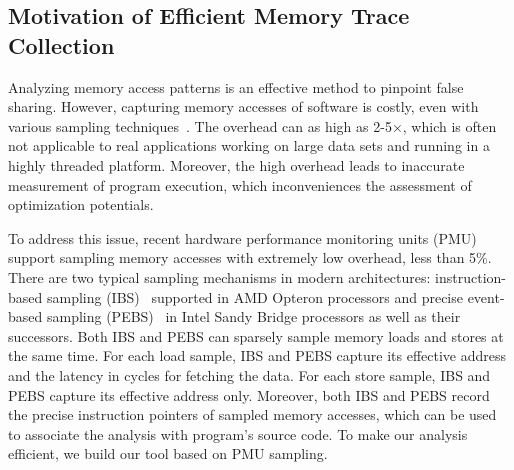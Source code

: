 \sloppy
\subsection{Motivation of Efficient Memory Trace Collection}
Analyzing memory access patterns is an effective method to pinpoint false sharing. However, capturing memory accesses of software is costly, even with various sampling techniques~\cite{}. The overhead can as high as 2-5$\times$, which is often not applicable to real applications working on large data sets and running in a highly threaded platform. Moreover, the high overhead leads to inaccurate measurement of program execution, which inconveniences the assessment of optimization potentials.

To address this issue, recent hardware performance monitoring units (PMU) support sampling memory accesses with extremely low overhead, less than 5\%. There are two typical sampling mechanisms in modern architectures: instruction-based sampling (IBS)~\cite{} supported in AMD Opteron processors and precise event-based sampling (PEBS)~\cite{} in Intel Sandy Bridge processors as well as their successors. Both IBS and PEBS can sparsely sample memory loads and stores at the same time. For each load sample, IBS and PEBS capture its effective address and the latency in cycles for fetching the data. For each store sample, IBS and PEBS capture its effective address only. Moreover, both IBS and PEBS record the precise instruction pointers of sampled memory accesses, which can be used to associate the analysis with program's source code. To make our analysis efficient, we build our tool based on PMU sampling. 

 



